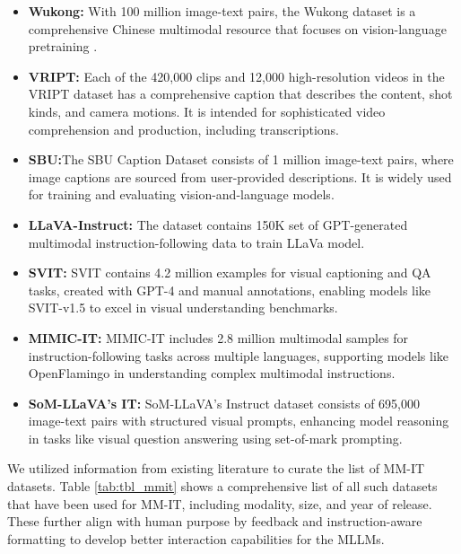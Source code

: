 \documentclass[runningheads]{llncs}
\begin{document}
\begin{itemize}
\item 
\textbf{Wukong:} With 100 million image-text pairs, the Wukong dataset is a comprehensive Chinese multimodal resource that focuses on vision-language pretraining \cite{ref133}.
\item 
\textbf{VRIPT:} Each of the 420,000 clips and 12,000 high-resolution videos in the VRIPT dataset \cite{ref125} has a comprehensive caption that describes the content, shot kinds, and camera motions. It is intended for sophisticated video comprehension and production, including transcriptions.
\item
\textbf{SBU:}The SBU Caption Dataset consists of 1 million image-text pairs, where image captions are sourced from user-provided descriptions. It is widely used for training and evaluating vision-and-language models\cite{ref132}.
    \item 
\textbf{LLaVA-Instruct:} The dataset contains 150K set of GPT-generated multimodal instruction-following data to train LLaVa\cite{ref136} model. 
    \item 
\textbf{SVIT:} SVIT\cite{ref135} contains 4.2 million examples for visual captioning and QA tasks, created with GPT-4 and manual annotations, enabling models like SVIT-v1.5 to excel in visual understanding benchmarks.
    \item 
\textbf{MIMIC-IT:} MIMIC-IT\cite{ref134} includes 2.8 million multimodal samples for instruction-following tasks across multiple languages, supporting models like OpenFlamingo in understanding complex multimodal instructions.
    \item 
\textbf{SoM-LLaVA's IT:} SoM-LLaVA's\cite{ref138} Instruct dataset consists of 695,000 image-text pairs with structured visual prompts, enhancing model reasoning in tasks like visual question answering using set-of-mark prompting.

\end{itemize}

We utilized information from existing literature \cite{ref139,ref132} to curate the list of MM-IT datasets. Table \ref{tab:tbl_mmit} shows a comprehensive list of all such datasets that have been used for MM-IT, including modality, size, and year of release. These further align with human purpose by feedback and instruction-aware formatting to develop better interaction capabilities for the MLLMs. 
\end{document}
